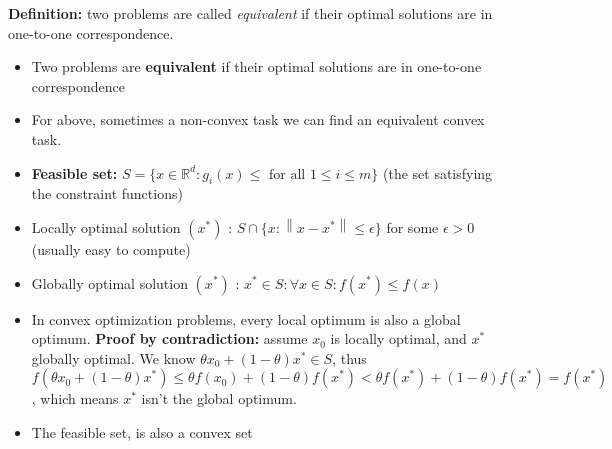 \documentclass[a4paper]{article}
\begin{document}
\textbf{Definition:} two problems are called \textit{equivalent} if their optimal solutions are in one-to-one correspondence.  
\begin{itemize}
    \item Two problems are \textbf{equivalent} if their optimal solutions are in one-to-one correspondence
    \item For above, sometimes a non-convex task we can find an equivalent convex task.
    \item \textbf{ Feasible set: } $S=\{x\in\mathbb{R}^d: g_i(x) \leq \text{ for all } 1\leq i \leq m\}$ (the set satisfying the constraint functions)
    \item Locally optimal solution $(x^*)$ : $S \cap \{x:\left\lVert x-x^*\right\rVert \leq \epsilon \} $ for some $\epsilon > 0$ (usually easy to compute)
    \item Globally optimal solution $(x^*)$ : $x^*\in S: \forall x \in S: f(x^*)\leq f(x)$
    \item In convex optimization problems, every local optimum is also a global optimum. \textbf{Proof by contradiction:} assume $x_0$ is locally optimal, and $x^*$ globally optimal. We know $\theta x_0 + (1-\theta)x^* \in S$, thus $f(\theta x_0 + (1-\theta)x^*) \leq \theta f(x_0) + (1-\theta)f(x^*) < \theta f(x^*) + (1-\theta)f(x^*) = f(x^*)$, which means $x^*$ isn't the global optimum.      
    \item The feasible set, is also a convex set     
\end{itemize}
 
\end{document}
